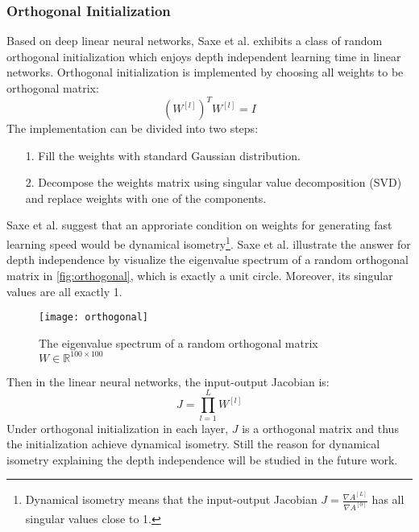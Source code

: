 \subsubsection{Orthogonal Initialization}
Based on deep linear neural networks, Saxe et al. \parencite{saxe2013exact} 
exhibits a class of random orthogonal initialization which enjoys depth 
independent learning time in linear networks. Orthogonal initialization is 
implemented by choosing all weights to be orthogonal matrix:
\begin{equation}
    (W^{[l]})^TW^{[l]} = I
\end{equation}
The implementation can be divided into two steps:
\begin{enumerate}
    \item[1.] Fill the weights with standard Gaussian distribution.
    \item[2.] Decompose the weights matrix using singular value decomposition 
    (SVD) and replace weights with one of the components. 
\end{enumerate}
Saxe et al. suggest that an approriate condition on weights for generating fast
learning speed would be dynamical isometry\footnote{Dynamical isometry means 
that the input-output Jacobian $ J = \frac{\nabla A^{[L]}}{\nabla A^{[0]}} $ 
has all singular values close to 1.}. Saxe et al. \parencite{saxe2013exact} 
illustrate the answer for depth independence by visualize the eigenvalue 
spectrum of a random orthogonal matrix in \autoref{fig:orthogonal}, which is 
exactly a unit circle. Moreover, its singular values are all exactly 1.
\begin{figure}[H]
    \centering
    \texttt{[image: orthogonal]}
    \caption{\label{fig:orthogonal}The eigenvalue spectrum of a 
    random orthogonal matrix $ W \in \mathbb{R}^{100\times 100} $}
\end{figure}
Then in the linear neural networks, the input-output Jacobian is:
\begin{equation}
    J = \prod\limits_{l=1}^LW^{[l]}
\end{equation}
Under orthogonal initialization in each layer, $ J $ is a orthogonal matrix and
thus the initialization achieve dynamical isometry. Still the reason for dynamical
isometry explaining the depth independence will be studied in the future work.

